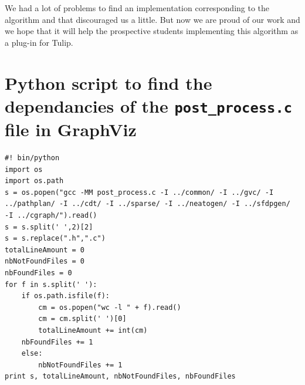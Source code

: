 \documentclass[12pt]{report}
\begin{document}
We had a lot of problems to find an implementation corresponding to the algorithm and that discouraged us a little. But now we are proud of our work and we hope that it will help the prospective students implementing this algorithm as a plug-in for Tulip.

\appendix
\chapter{Python script to find the dependancies of the \texttt{post\_process.c} file in GraphViz}

\begin{verbatim}
#! bin/python
import os
import os.path
s = os.popen("gcc -MM post_process.c -I ../common/ -I ../gvc/ -I 
../pathplan/ -I ../cdt/ -I ../sparse/ -I ../neatogen/ -I ../sfdpgen/ 
-I ../cgraph/").read()
s = s.split(' ',2)[2]
s = s.replace(".h",".c")
totalLineAmount = 0
nbNotFoundFiles = 0
nbFoundFiles = 0
for f in s.split(' '):
    if os.path.isfile(f):
        cm = os.popen("wc -l " + f).read()
        cm = cm.split(' ')[0]
        totalLineAmount += int(cm)
	nbFoundFiles += 1
    else:
        nbNotFoundFiles += 1
print s, totalLineAmount, nbNotFoundFiles, nbFoundFiles
\end{verbatim}



\end{document}
